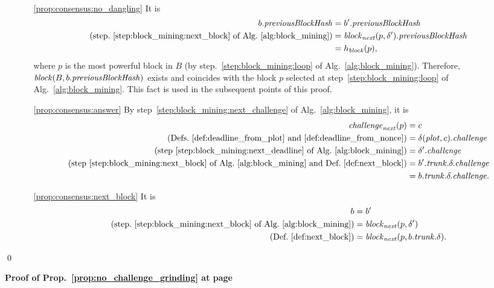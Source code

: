 \begin{itemize}
\begin{itemize}
\begin{align*}
      \end{align*}
    \item[\ref{prop:consensus:no_dangling}] It is
      \begin{align*}
        b.{\mathit{previousBlockHash}}&=b'.{\mathit{previousBlockHash}}\\
        \text{(step.~\ref{step:block_mining:next_block} of Alg.~\ref{alg:block_mining})}
        &={\mathit{block}}_{\mathit{next}}(p,\delta').{\mathit{previousBlockHash}}\\
        &=h_{\mathit{block}}(p),
      \end{align*}
      where $p$ is the most powerful block in $B$ (by step.~\ref{step:block_mining:loop}
      of Alg.~\ref{alg:block_mining}). Therefore, ${\mathit{block}}(B,b.{\mathit{previousBlockHash}})$ exists
      and coincides with the block $p$ selected at step~\ref{step:block_mining:loop}
      of Alg.~\ref{alg:block_mining}. This fact is used in the subsequent points of this proof.
    \item[\ref{prop:consensus:answer}] By step~\ref{step:block_mining:next_challenge}
      of Alg.~\ref{alg:block_mining}, it is
      \begin{align*}
        {\mathit{challenge}}_{\mathit{next}}(p)&=c\\
        \text{(Defs.~\ref{def:deadline_from_plot} and~\ref{def:deadline_from_nonce})}&=
        \delta({\mathit{plot}},c).{\mathit{challenge}}\\
        \text{(step~\ref{step:block_mining:next_deadline} of Alg.~\ref{alg:block_mining})}&=\delta'.{\mathit{challenge}}\\
        \text{(step~\ref{step:block_mining:next_block} of Alg.~\ref{alg:block_mining} and Def.~\ref{def:next_block})}&=b'.{\mathit{trunk}}.\delta.{\mathit{challenge}}\\
        &=b.{\mathit{trunk}}.\delta.{\mathit{challenge}}.
      \end{align*}
    \item[\ref{prop:consensus:next_block}] It is
      \begin{align*}
        b&=b'\\
        \text{(step.~\ref{step:block_mining:next_block} of Alg.~\ref{alg:block_mining})}
        &={\mathit{block}}_{\mathit{next}}(p,\delta')\\
        \text{(Def.~\ref{def:next_block})}&={\mathit{block}}_{\mathit{next}}(p,b.{\mathit{trunk}}.\delta).
      \end{align*}
    \end{itemize}
  \end{itemize}
  \qed

\noindent
\textbf{Proof of Prop.~\ref{prop:no_challenge_grinding} at page~\pageref{prop:no_challenge_grinding}}

